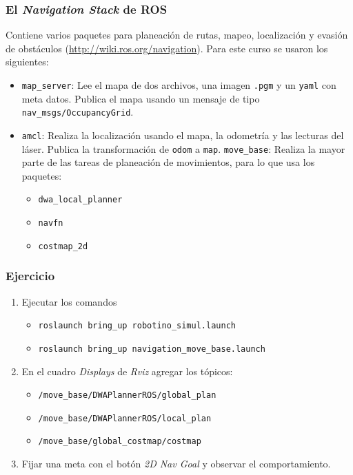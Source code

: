 \documentclass[10pt,spanish,aspectratio=1610]{beamer}
\begin{document}
\begin{frame}\frametitle{El \textit{Navigation Stack} de ROS}
  Contiene varios paquetes para planeación de rutas, mapeo, localización y evasión de obstáculos (\url{http://wiki.ros.org/navigation}). Para este curso se usaron los siguientes:
  \begin{itemize}
  \item \texttt{map\_server}: Lee el mapa de dos archivos, una imagen \texttt{.pgm} y un \texttt{yaml} con meta datos. Publica el mapa usando un mensaje de tipo \texttt{nav\_msgs/OccupancyGrid}.
  \item \texttt{amcl}: Realiza la localización usando el mapa, la odometría y las lecturas del láser. Publica la transformación de \texttt{odom} a \texttt{map}.
    \texttt{move\_base}: Realiza la mayor parte de las tareas de planeación de movimientos, para lo que usa los paquetes:
    \begin{itemize}
    \item \texttt{dwa\_local\_planner}
    \item \texttt{navfn}
    \item \texttt{costmap\_2d}
    \end{itemize}
  \end{itemize}
\end{frame}

\begin{frame}\frametitle{Ejercicio}
  \begin{enumerate}
  \item Ejecutar los comandos
    \begin{itemize}
    \item \texttt{roslaunch bring\_up robotino\_simul.launch}
    \item \texttt{roslaunch bring\_up navigation\_move\_base.launch}
    \end{itemize}
  \item En el cuadro \textit{Displays} de \textit{Rviz} agregar los tópicos:
    \begin{itemize}
    \item \texttt{/move\_base/DWAPlannerROS/global\_plan}
    \item \texttt{/move\_base/DWAPlannerROS/local\_plan}
    \item \texttt{/move\_base/global\_costmap/costmap}
    \end{itemize}
    \item Fijar una meta con el botón \textit{2D Nav Goal} y observar el comportamiento.
  \end{enumerate}
\end{frame}
\end{document}
